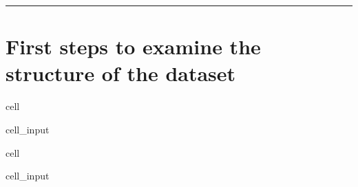 \documentclass[letterpaper,10pt,english]{sphinxmanual}
\begin{document}
\bigskip\hrule\bigskip



\section{First steps to examine the structure of the dataset}
\label{\detokenize{Automatidata_EDA:first-steps-to-examine-the-structure-of-the-dataset}}
\begin{sphinxuseclass}{cell}
\begin{sphinxuseclass}{cell_input}
\begin{sphinxVerbatim}[commandchars=\\\{\}]
   
   
   
   
\end{sphinxVerbatim}

\end{sphinxuseclass}
\end{sphinxuseclass}
\begin{sphinxuseclass}{cell}
\begin{sphinxuseclass}{cell_input}
\begin{sphinxVerbatim}[commandchars=\\\{\}]
  
\end{sphinxVerbatim}

\end{sphinxuseclass}
\end{sphinxuseclass}
\end{document}
